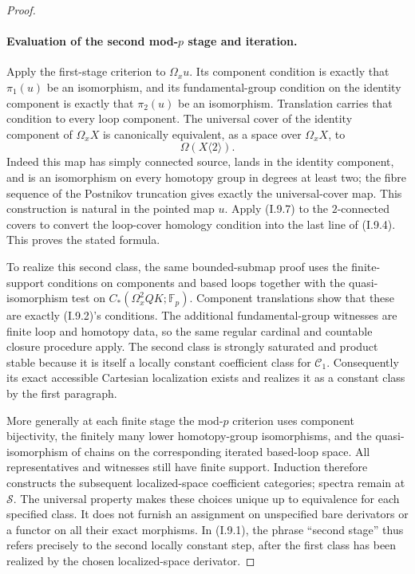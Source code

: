 \begin{proof}
\paragraph{Evaluation of the second mod-$p$ stage and iteration.}
Apply the first-stage criterion to $\Omega_xu$. Its component condition is exactly that $\pi_1(u)$ be an isomorphism, and its fundamental-group condition on the identity component is exactly that $\pi_2(u)$ be an isomorphism. Translation carries that condition to every loop component. The universal cover of the identity component of $\Omega_xX$ is canonically equivalent, as a space over $\Omega_xX$, to
\[
 \Omega(X\langle2\rangle).
\]
Indeed this map has simply connected source, lands in the identity component, and is an isomorphism on every homotopy group in degrees at least two; the fibre sequence of the Postnikov truncation gives exactly the universal-cover map. This construction is natural in the pointed map $u$. Apply (I.9.7) to the $2$-connected covers to convert the loop-cover homology condition into the last line of (I.9.4). This proves the stated formula.

To realize this second class, the same bounded-submap proof uses the finite-support conditions on components and based loops together with the quasi-isomorphism test on $C_*(\Omega^2_xQK;\mathbb F_p)$. Component translations show that these are exactly (I.9.2)'s conditions. The additional fundamental-group witnesses are finite loop and homotopy data, so the same regular cardinal and countable closure procedure apply. The second class is strongly saturated and product stable because it is itself a locally constant coefficient class for $\mathcal C_1$. Consequently its exact accessible Cartesian localization exists and realizes it as a constant class by the first paragraph.

More generally at each finite stage the mod-$p$ criterion uses component bijectivity, the finitely many lower homotopy-group isomorphisms, and the quasi-isomorphism of chains on the corresponding iterated based-loop space. All representatives and witnesses still have finite support. Induction therefore constructs the subsequent localized-space coefficient categories; spectra remain at $\mathcal S$. The universal property makes these choices unique up to equivalence for each specified class. It does not furnish an assignment on unspecified bare derivators or a functor on all their exact morphisms. In (I.9.1), the phrase ``second stage'' thus refers precisely to the second locally constant step, after the first class has been realized by the chosen localized-space derivator.
\end{proof}
